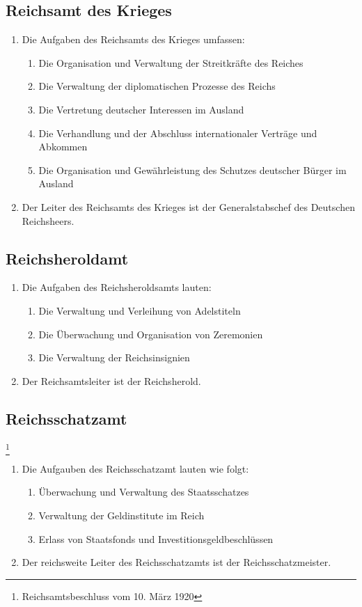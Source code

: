 \documentclass{article}
\begin{document}
\subsection{Reichsamt des Krieges}
\begin{enumerate}[(1)]
    \item Die Aufgaben des Reichsamts des Krieges umfassen:
    \begin{enumerate}[1.]
        \item Die Organisation und Verwaltung der Streitkräfte des Reiches
        \item Die Verwaltung der diplomatischen Prozesse des Reichs
        \item Die Vertretung deutscher Interessen im Ausland
        \item Die Verhandlung und der Abschluss internationaler Verträge und Abkommen
        \item Die Organisation und Gewährleistung des Schutzes deutscher Bürger im Ausland
    \end{enumerate}
    \item Der Leiter des Reichsamts des Krieges ist der Generalstabschef des Deutschen Reichsheers.
\end{enumerate}

\subsection{Reichsheroldamt}
\begin{enumerate}[(1)]
    \item Die Aufgaben des Reichsheroldsamts lauten:
    \begin{enumerate}[1.]
        \item Die Verwaltung und Verleihung von Adelstiteln
        \item Die Überwachung und Organisation von Zeremonien
        \item Die Verwaltung der Reichsinsignien
    \end{enumerate}
    \item Der Reichsamtsleiter ist der Reichsherold.
\end{enumerate}

\subsection{Reichsschatzamt}\footnote{Reichsamtsbeschluss vom 10. März 1920}
\begin{enumerate}[(1)]
    \item Die Aufgauben des Reichsschatzamt lauten wie folgt:
    \begin{enumerate}[1.]
        \item Überwachung und Verwaltung des Staatsschatzes
        \item Verwaltung der Geldinstitute im Reich
        \item Erlass von Staatsfonds und Investitionsgeldbeschlüssen
    \end{enumerate}
    \item Der reichsweite Leiter des Reichsschatzamts ist der Reichsschatzmeister.
\end{enumerate}
\end{document}

